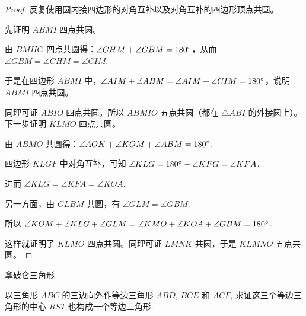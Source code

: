\begin{proof}
反复使用圆内接四边形的对角互补以及对角互补的四边形顶点共圆。

先证明 $ ABMI $ 四点共圆。

由 $ BMHG $ 四点共圆得：$ \angle GHM + \angle GBM = 180 \degree $，从而 $ \angle GBM = \angle CHM = \angle CIM $.

于是在四边形 $ ABMI $ 中，$ \angle AIM + \angle ABM = \angle AIM + \angle CIM = 180\degree $，说明 $ ABMI $ 四点共圆。

同理可证 $ ABIO $ 四点共圆。所以 $ ABMIO $ 五点共圆（都在 $ \triangle ABI $ 的外接圆上）。下一步证明 $ KLMO $ 四点共圆。

由 $ ABMO $ 共圆得：$ \angle AOK + \angle KOM + \angle ABM = 180\degree $.

四边形 $ KLGF $ 中对角互补，可知 $ \angle KLG = 180\degree - \angle KFG = \angle KFA $.

进而 $ \angle KLG = \angle KFA = \angle KOA $.

另一方面，由 $ GLBM $ 共圆，有 $ \angle GLM = \angle GBM $.

所以 $ \angle KOM + \angle KLG + \angle GLM = \angle KMO + \angle KOA + \angle GBM = 180\degree $.

这样就证明了 $ KLMO $ 四点共圆。同理可证 $ LMNK $ 共圆，于是 $ KLMNO $ 五点共圆。

\end{proof}

\newpage
\noindent 拿破仑三角形 

以三角形 $ ABC $ 的三边向外作等边三角形 $ ABD $, $ BCE $ 和 $ ACF $, 求证这三个等边三角形的中心 $ RST $ 也构成一个等边三角形.

